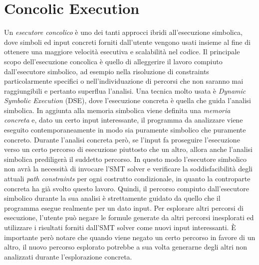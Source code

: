 \documentclass[Lau, oneside]{sapthesis}%
\begin{document}
\newpage
\section{Concolic Execution}
Un \textit{esecutore concolico} è uno dei tanti approcci ibridi all'esecuzione simbolica, dove simboli ed input concreti forniti dall'utente vengono usati insieme al fine di ottenere una maggiore velocità esecutiva e scalabilità nel codice.
\newline \newline
Il principale scopo dell'esecuzione concolica è quello di alleggerire il lavoro compiuto dall'esecutore simbolico, ad esempio nella risoluzione di constraints particolarmente specifici o nell'individuazione di percorsi che non saranno mai raggiungibili e pertanto superflua l'analisi.
\newline \newline
Una tecnica molto usata è \textit{Dynamic Symbolic Execution} (DSE), dove l'esecuzione concreta è quella che guida l'analisi simbolica.
\newline \newline
In aggiunta alla memoria simbolica viene definita una \textit{memoria concreta} e, dato un certo input interessante, il programma da analizzare viene eseguito contemporaneamente in modo sia puramente simbolico che puramente concreto.
\newline
Durante l'analisi concreta però, se l'input fa proseguire l'esecuzione verso un certo percorso di esecuzione piuttosto che un altro, allora anche l'analisi simbolica prediligerà il suddetto percorso.
\newline
In questo modo l'esecutore simbolico non avrà la necessità di invocare l'SMT solver e verificare la soddisfacibilità degli attuali \textit{path constraints} per ogni costrutto condizionale, in quanto la controparte concreta ha già svolto questo lavoro.
\newline
Quindi, il percorso compiuto dall'esecutore simbolico durante la sua analisi è strettamente guidato da quello che il programma esegue realmente per un dato input.
\newline
Per esplorare altri percorsi di esecuzione, l'utente può negare le formule generate da altri percorsi inesplorati ed utilizzare i risultati forniti dall'SMT solver come nuovi input interessanti.
\newline \newline
È importante però notare che quando viene negato un certo percorso in favore di un altro, il nuovo percorso esplorato potrebbe a sua volta generarne degli altri non analizzati durante l'esplorazione concreta.
\end{document}
